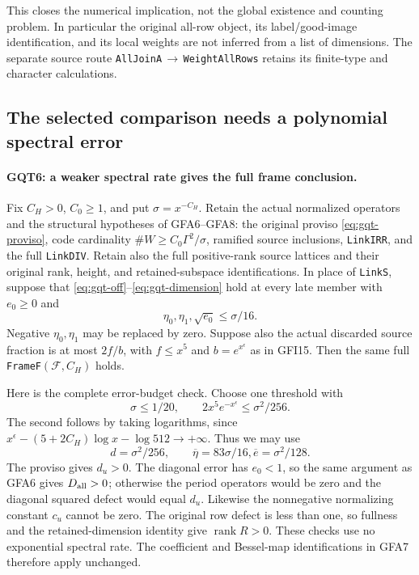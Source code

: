 This closes the numerical implication, not the global existence
and counting problem. In particular the original all-row object,
its label/good-image identification, and its local weights are
not inferred from a list of dimensions. The separate source route
\texttt{AllJoinA}\,$\to$\,\texttt{WeightAllRows} retains its
finite-type and character calculations.

\subsection{The selected comparison needs a polynomial spectral error}

\paragraph{GQT6: a weaker spectral rate gives the full frame conclusion.}
\label{claim:GQT6}
Fix $C_H>0$, $C_0\ge1$, and put $\sigma=x^{-C_H}$. Retain the actual normalized
operators and the structural hypotheses of GFA6--GFA8: the original
proviso \eqref{eq:gqt-proviso}, code cardinality
$\#W\ge C_0\Gamma^2/\sigma$, ramified source inclusions,
\texttt{LinkIRR}, and the full \texttt{LinkDIV}. Retain also the
full positive-rank source lattices and their original rank, height,
and retained-subspace identifications. In place of
\texttt{LinkS}, suppose that
\eqref{eq:gqt-off}--\eqref{eq:gqt-dimension} hold at every late
member with $e_0\ge0$ and
\begin{equation}\label{eq:gqt-poly}
       \eta_0,\eta_1,\sqrt{e_0}\le\sigma/16.
\end{equation}
Negative $\eta_0,\eta_1$ may be replaced by zero. Suppose also
the actual discarded source fraction is at most $2f/b$, with
$f\le x^5$ and $b=e^{x^\epsilon}$ as in GFI15.
Then the same full \texttt{FrameF}$(\mathcal F,C_H)$ holds.

Here is the complete error-budget check. Choose one threshold with
\[
 \sigma\le1/20,\qquad 2x^5e^{-x^\epsilon}
                                      \le\sigma^2/256.
\]
The second follows by taking logarithms, since
$x^\epsilon-(5+2C_H)\log x-\log512\to+\infty$.
Thus we may use
\[
      d=\sigma^2/256,\qquad
      \overline\eta=83\sigma/16,
      \overline e=\sigma^2/128.                         \label{eq:gqt-frame-errors}
\]
The proviso gives $d_u>0$. The diagonal error has $e_0<1$,
so the same argument as GFA6 gives $D_{\rm all}>0$; otherwise
the period operators would be zero and the diagonal squared
defect would equal $d_u$. Likewise the nonnegative normalizing
constant $c_u$ cannot be zero. The original row defect is less
than one, so fullness and the retained-dimension identity give
$\operatorname{rank}R>0$. These checks use no exponential
spectral rate. The coefficient and Bessel-map identifications
in GFA7 therefore apply unchanged.

